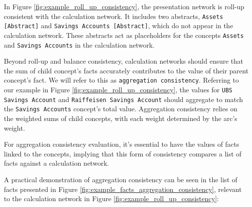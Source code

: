 
In Figure \ref{fig:example_roll_up_consistency}, the presentation network is roll-up consistent with the calculation network.  
It includes two abstracts, \texttt{Assets [Abstract]} and \texttt{Savings Accounts [Abstract]}, which do not appear in the calculation network.  
These abstracts act as placeholders for the concepts \texttt{Assets} and \texttt{Savings Accounts} in the calculation network.

Beyond roll-up and balance consistency, calculation networks should ensure that the sum of child concept's facts accurately contributes to the value of their parent concept's fact.
We will refer to this as \texttt{aggregation consistency}.
Referring to our example in Figure \ref{fig:example_roll_up_consistency},  
the values for \texttt{UBS Savings Account} and \texttt{Raiffeisen Savings Account} should aggregate to match the \texttt{Savings Accounts} concept's total value.  
Aggregation consistency relies on the weighted sums of child concepts, with each weight determined by the arc's weight.

For aggregation consistency evaluation, it's essential to have the values of facts linked to the concepts,  
implying that this form of consistency compares a list of facts against a calculation network.

A practical demonstration of aggregation consistency can be seen in the list of facts presented in Figure \ref{fig:example_facts_aggregation_consistency}, 
relevant to the calculation network in Figure \ref{fig:example_roll_up_consistency}:

